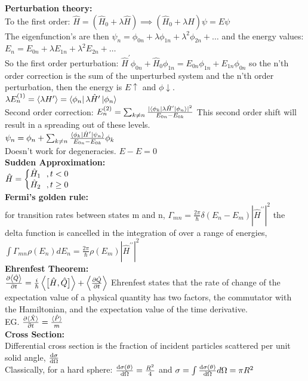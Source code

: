 \documentclass[10pt,landscape,a4paper]{article}
\newcommand{\minititle}[1]{\textbf{#1:}\\}
\renewcommand{\^}[1]{\ensuremath{\hat{#1}}}
\newcommand{\h}{\hbar}
\begin{document}
\begin{multicols}{4}
	\minititle{Perturbation theory}
	To the first order: $ \^H = (\^H_0+\lambda\^H) \implies (\^H_0 + \lambda\^H)\psi = E\psi $\\
	The eigenfunction's are then $ \psi_n = \phi_{0n} + \lambda\phi_{1n} + \lambda^2\phi_{2n} + \ldots $ and the energy values: $ E_n = E_{0n} + \lambda E_{1n} + \lambda^2 E_{2n} + \ldots $\\
	So the first order perturbation: $ \^H^\prime\phi_{0n} + \^H_0\phi_{1n} = E_{0n}\phi_{1n}+E_{1n}\phi_{0n} $ so the n'th order correction is the sum of the unperturbed system and the n'th order perturbation, then the energy is $ E\uparrow $ and $ \phi\downarrow $.\\
	$ \lambda E^{(1)}_n = \expval{\lambda H^\prime} = \bra{\phi_n}\lambda\^H^\prime\ket{\phi_n} $\\
	Second order correction: $ E^{(2)}_n = \sum_{k\ne n} \frac{|\bra{\phi_k}\lambda\^H^\prime\ket{\phi_n}|^2}{E_{0n}-E_{0k}} $ This second order shift will result in a spreading out of these levels.\\
	$ \psi_n = \phi_n+\sum_{k\ne n}\frac{\bra{\phi_k}\^H^\prime\ket{\psi_n}}{E_{0n}-E_{0k}}\phi_k $\\
	Doesn't work for degeneracies. $ E-E = 0 $\\
	\minititle{Sudden Approximation}
	$ \^H = \left\{ \mqty{\^H_1~~,t<0 \\ \^H_2~~,t\ge 0} \right. $\\
	\minititle{Fermi's golden rule} for transition rates between states m and n, $ \Gamma_{mn} = \frac{2\pi}{\h}\delta(E_n-E_m)|\^H^{\prime\prime}|^2 $ the delta function is cancelled in the integration of over a range of energies, $ \int\Gamma_{mn}\rho(E_n)dE_n = \frac{2\pi}{\h}\rho(E_m)|\^H^{\prime\prime}|^2 $\\
	\minititle{Ehrenfest Theorem}
	$ \pdv{\expval{\^Q}}{t} = \frac{i}{\h}\expval{\comm\big{\^H}{\^Q}}+\expval{\pdv{\^Q}{t}} $
	Ehrenfest states that the rate of change of the expectation value of a physical quantity has two factors, the commutator with the Hamiltonian, and the expectation value of the time derivative.\\
	EG. $ \pdv{\expval*{\^X}}{t} = \frac{\expval*{\^P}}{m} $\\
	\minititle{Cross Section}
	Differential cross section is the fraction of incident particles scattered per unit solid angle, $ \dv{\sigma}{\Omega} $\\
	Classically, for a hard sphere: $ \dv{\sigma(\theta)}{\Omega} = \frac{R^2}{4} $ and $ \sigma = \int\dv{\sigma(\theta)}{\Omega}d\Omega = \pi R^2  $\\

\end{multicols}
\end{document}
